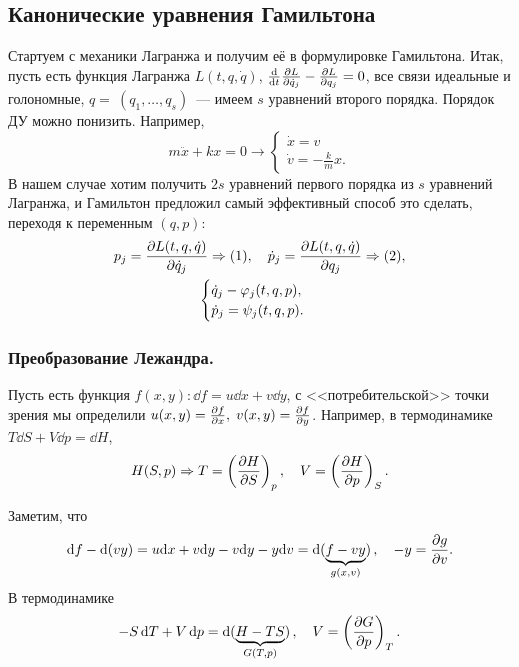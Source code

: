 \documentclass[12pt, a4paper]{article}
\begin{document}
\subsection{Канонические уравнения Гамильтона}
Стартуем с механики Лагранжа и получим её в формулировке Гамильтона. Итак, пусть есть функция Лагранжа $L(t, q, \dot{q})$, $\dv{t}\pdv{L}{\dot{q}_j} - \pdv{L}{q_j} =0$, все связи идеальные и голономные, $q =~(q_1, \ldots, q_s)$~--- имеем $s$ уравнений второго порядка.
Порядок ДУ можно понизить. Например,
\begin{equation}
m \ddot{x} + kx = 0 \longrightarrow
\begin{cases}
\dot{x} = v\\
\dot{v} = - \frac{k}{m}x.
\end{cases}
\end{equation}
В нашем случае хотим получить $2s$ уравнений первого порядка из $s$ уравнений Лагранжа, и Гамильтон предложил самый эффективный способ это сделать, переходя к переменным $(q, p)$:
\begin{gather}
p_j = \pdv{L(t, q, \dot{q})}{\dot{q}_j} \Rightarrow (1), \quad \dot{p}_j = \pdv{L(t, q, \dot{q})}{q_j} \Rightarrow (2),\\
\begin{cases}
\dot{q}_j - \varphi_j (t, q, p),\\
\dot{p}_j = \psi_j (t, q, p).
\end{cases}
\end{gather}

\subsubsection{Преобразование Лежандра.}
Пусть есть функция $f(x, y): \dd{f} = u \dd{x} + v \dd{y}$, с <<потребительской>> точки зрения мы определили $u(x, y) = \pdv{f}{x}, \; v(x, y) = \pdv{f}{y}$. Например, в термодинамике $T \dd{S} + V \dd{p} = \dd{H}$,
\begin{equation}
H(S, p) \Rightarrow T = \left(\pdv{H}{S}\right)_p, \quad V = \left(\pdv{H}{p}\right)_S.
\end{equation}

Заметим, что 
\begin{equation}
\dd f - \dd (vy) = u \dd x + v \dd y - v \dd y - y \dd v = \dd{(\underbrace{f- vy}_{g(x, v)})}, \quad -y = \pdv{g}{v}.
\end{equation}
В термодинамике 
\begin{equation}
-S \dd{T} + V \dd{p} = \dd{(\underbrace{H - TS}_{G(T, p)})}, \quad V = \left(\pdv{G}{p}\right)_T.
\end{equation}
\end{document}
